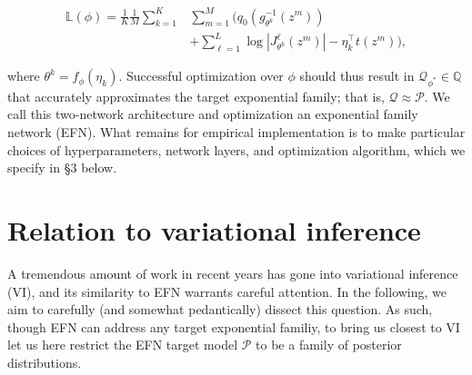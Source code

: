 \documentclass[twoside]{article}
\begin{document}
{\small 
\begin{equation}
\begin{split}
 \mathbb{L}(\phi) = \frac{1}{K}\frac{1}{M}\sum_{k=1}^K & \sum_{m=1}^M \bigg( q_0\left( g_{\theta^k}^{-1}\left(z^m\right)\right) \\ & + \sum_{\ell=1}^L  \log | J^\ell_{\theta^k}\left(z^m\right) | - \eta_k^\top t\left(z^m\right) \bigg),
\end{split}
\end{equation} }

where $\theta^k = f_\phi\left(\eta_k\right)$.  Successful optimization over $\phi$ should thus result in $\mathcal{Q}_{\phi^*} \in \mathbb{Q}$ that accurately approximates the target exponential family; that is, $\mathcal{Q} \approx \mathcal{P}$.  We call this two-network architecture and optimization an exponential family network (EFN).   What remains for empirical implementation is to make particular choices of hyperparameters, network layers, and optimization algorithm, which we specify in \S3 below.

\section{Relation to variational inference}

A tremendous amount of work in recent years has gone into variational inference (VI), and its similarity to EFN warrants careful attention. 
In the following, we aim to carefully (and somewhat pedantically) dissect this question.  
As such, though EFN can address any target exponential familiy, to bring us closest to VI let us here restrict the EFN target model $\mathcal{P}$ to be a family of posterior distributions.  
\end{document}
